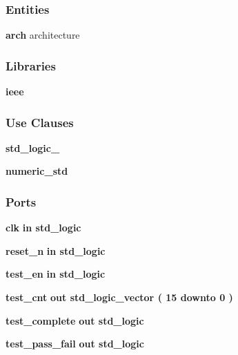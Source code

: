 \subsubsection*{Entities}
\begin{DoxyCompactItemize}
\item 
{\bf arch} architecture
\end{DoxyCompactItemize}
\subsubsection*{Libraries}
 \begin{DoxyCompactItemize}
\item 
{\bf ieee} 
\end{DoxyCompactItemize}
\subsubsection*{Use Clauses}
 \begin{DoxyCompactItemize}
\item 
{\bf std\+\_\+logic\+\_}   
\item 
{\bf numeric\+\_\+std}   
\end{DoxyCompactItemize}
\subsubsection*{Ports}
 \begin{DoxyCompactItemize}
\item 
{\bf clk}  {\bfseries {\bfseries \textcolor{keywordflow}{in}\textcolor{vhdlchar}{ }}} {\bfseries \textcolor{comment}{std\+\_\+logic}\textcolor{vhdlchar}{ }} 
\item 
{\bf reset\+\_\+n}  {\bfseries {\bfseries \textcolor{keywordflow}{in}\textcolor{vhdlchar}{ }}} {\bfseries \textcolor{comment}{std\+\_\+logic}\textcolor{vhdlchar}{ }} 
\item 
{\bf test\+\_\+en}  {\bfseries {\bfseries \textcolor{keywordflow}{in}\textcolor{vhdlchar}{ }}} {\bfseries \textcolor{comment}{std\+\_\+logic}\textcolor{vhdlchar}{ }} 
\item 
{\bf test\+\_\+cnt}  {\bfseries {\bfseries \textcolor{keywordflow}{out}\textcolor{vhdlchar}{ }}} {\bfseries \textcolor{comment}{std\+\_\+logic\+\_\+vector}\textcolor{vhdlchar}{ }\textcolor{vhdlchar}{(}\textcolor{vhdlchar}{ }\textcolor{vhdlchar}{ } \textcolor{vhdldigit}{15} \textcolor{vhdlchar}{ }\textcolor{keywordflow}{downto}\textcolor{vhdlchar}{ }\textcolor{vhdlchar}{ } \textcolor{vhdldigit}{0} \textcolor{vhdlchar}{ }\textcolor{vhdlchar}{)}\textcolor{vhdlchar}{ }} 
\item 
{\bf test\+\_\+complete}  {\bfseries {\bfseries \textcolor{keywordflow}{out}\textcolor{vhdlchar}{ }}} {\bfseries \textcolor{comment}{std\+\_\+logic}\textcolor{vhdlchar}{ }} 
\item 
{\bf test\+\_\+pass\+\_\+fail}  {\bfseries {\bfseries \textcolor{keywordflow}{out}\textcolor{vhdlchar}{ }}} {\bfseries \textcolor{comment}{std\+\_\+logic}\textcolor{vhdlchar}{ }} 
\end{DoxyCompactItemize}



